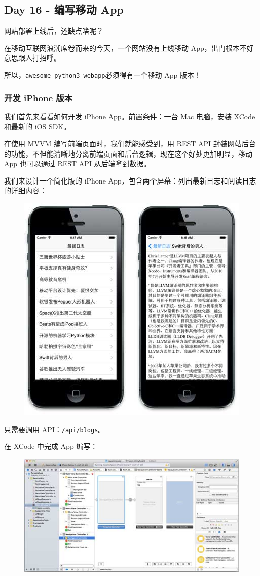 \hypertarget{day-16---ux7f16ux5199ux79fbux52a8-app}{%
\subsection{Day 16 - 编写移动
App}\label{day-16---ux7f16ux5199ux79fbux52a8-app}}

网站部署上线后，还缺点啥呢？

在移动互联网浪潮席卷而来的今天，一个网站没有上线移动
App，出门根本不好意思跟人打招呼。

所以，\texttt{awesome-python3-webapp}必须得有一个移动 App 版本！

\hypertarget{ux5f00ux53d1-iphone-ux7248ux672c}{%
\subsubsection{开发 iPhone
版本}\label{ux5f00ux53d1-iphone-ux7248ux672c}}

我们首先来看看如何开发 iPhone App。前置条件：一台 Mac 电脑，安装 XCode
和最新的 iOS SDK。

在使用 MVVM 编写前端页面时，我们就能感受到，用 REST API
封装网站后台的功能，不但能清晰地分离前端页面和后台逻辑，现在这个好处更加明显，移动
App 也可以通过 REST API 从后端拿到数据。

我们来设计一个简化版的 iPhone
App，包含两个屏幕：列出最新日志和阅读日志的详细内容：

 
 \begin{figure}[htp]
	\centering
	\includegraphics[width=0.6\linewidth]{fig/956198702546240.png}
\end{figure}


只需要调用 API：\texttt{/api/blogs}。

在 XCode 中完成 App 编写：

 
 \begin{figure}[htp]
	\centering
	\includegraphics[width=0.6\linewidth]{fig/956198878703904.png}
\end{figure}


